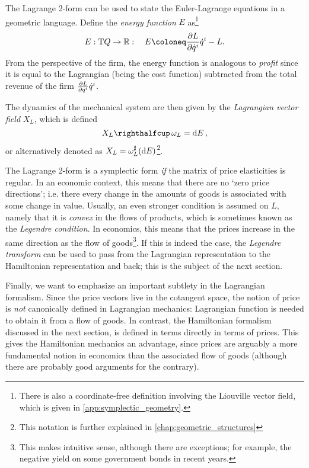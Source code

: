 The Lagrange 2-form can be used to state the Euler-Lagrange equations in a geometric language. Define the \emph{energy function} \(E\) as\footnote{There is also a coordinate-free definition involving the Liouville vector field, which is given in \cref{app:symplectic_geometry}.}
\begin{equation}
    E: \tbundle{Q} \to \real: \quad E \coloneq \pdv{L}{\dot{q}^i}\dot{q}^i - L.
\end{equation}
From the perspective of the firm, the energy function is analogous to \emph{profit} since it is equal to the Lagrangian (being the cost function) subtracted from the total revenue of the firm \(\pdv{L}{\dot{q}^i}\dot{q}^i\).
    
The dynamics of the mechanical system are then given by the \emph{Lagrangian vector field} \(X_L\), which is defined 
\begin{equation}
    \intpr{X_L}{\omega_L} = \dd{E}, 
\end{equation}
or alternatively denoted as \(X_L = \omega_L^\sharp(\dd{E})\)\footnote{This notation is further explained in \cref{chap:geometric_structures}}.

The Lagrange 2-form is a symplectic form \emph{if} the matrix of price elasticities is regular. In an economic context, this means that there are no `zero price directions'; i.e. there every change in the amounts of goods is associated with some change in value. Usually, an even stronger condition is assumed on \(L\), namely that it is \emph{convex} in the flows of products, which is sometimes known as the \emph{Legendre condition}. In economics, this means that the prices increase in the same direction as the flow of goods\footnote{This makes intuitive sense, although there are exceptions; for example, the negative yield on some government bonds in recent years.}. If this is indeed the case, the \emph{Legendre transform} can be used to pass from the Lagrangian representation to the Hamiltonian representation and back; this is the subject of the next section. 

Finally, we want to emphasize an important subtlety in the Lagrangian formalism. Since the price vectors live in the cotangent space, the notion of price is \emph{not} canonically defined in Lagrangian mechanics:  Lagrangian function is needed to obtain it from a flow of goods. In contrast, the Hamiltonian formalism discussed in the next section, is defined in terms directly in terms of prices. This gives the Hamiltonian mechanics an advantage, since prices are arguably a more fundamental notion in economics than the associated flow of goods (although there are probably good arguments for the contrary).

